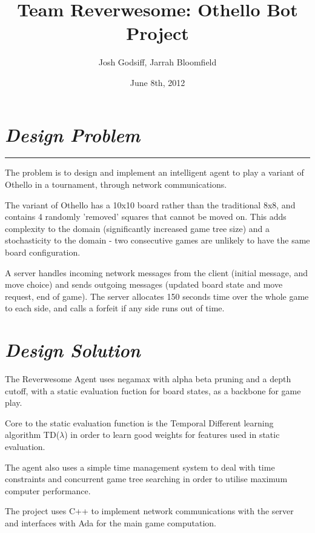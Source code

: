 \documentclass[10pt]{report}
\begin{document}
\date{June 8th, 2012}
\title{Team Reverwesome: Othello Bot Project}
\author{Josh Godsiff, Jarrah Bloomfield}
\maketitle

\setlength{\columnsep}{22.0pt}
\begin{multicols}{2}

\section*{\emph{Design Problem}}
\hrule

The problem is to design and implement an intelligent agent to play a variant of Othello in a tournament, through network communications.

The variant of Othello has a 10x10 board rather than the traditional 8x8, and contains 4 randomly 'removed' squares that cannot be moved on. This adds complexity to the domain (significantly increased game tree size) and a stochasticity to the domain - two consecutive games are unlikely to have the same board configuration.

A server handles incoming network messages from the client (initial message, and move choice) and sends outgoing messages (updated board state and move request, end of game). The server allocates 150 seconds time over the whole game to each side, and calls a forfeit if any side runs out of time.

\section*{\emph{Design Solution}}

The Reverwesome Agent uses negamax with alpha beta pruning and a depth cutoff, with a static evaluation fuction for board states, as a backbone for game play.

Core to the static evaluation function is the Temporal Different learning algorithm TD($\lambda$) in order to learn good weights for features used in static evaluation.

The agent also uses a simple time management system to deal with time constraints and concurrent game tree searching in order to utilise maximum computer performance.

The project uses C++ to implement network communications with the server and interfaces with Ada for the main game computation.


\end{multicols}
\end{document}
